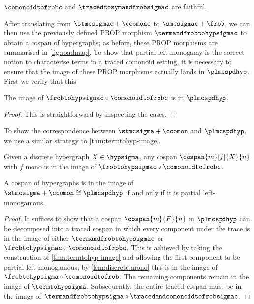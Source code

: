 \begin{corollary}
    \(\comonoidtofrobc\) and \(\tracedtosymandfrobsigmac\) are faithful.
\end{corollary}

After translating from \(\stmcsigmac + \ccomonc\) to \(\smcsigmac + \frob\),
we can then use the previously defined PROP morphism \(\termandfrobtohypsigmac\)
to obtain a cospan of hypergraphs; as before, these PROP morphisms are
summarised in \cref{fig:roadmap}.
To show that partial left-monogamy is the correct notion to characterise terms
in a traced comonoid setting, it is necessary to ensure that the image of these
PROP morphisms actually lands in \(\plmcspdhyp\).
First we verify that this

\begin{lemma}
    The image of \(\frobtohypsigmac \circ \comonoidtofrobc\) is in
    \(\plmcspdhyp\).
\end{lemma}
\begin{proof}
    This is straightforward by inspecting the cases.
\end{proof}

To show the correspondence between \(\stmcsigma + \ccomon\) and
\(\plmcspdhyp\), we use a similar strategy to \cref{thm:termtohyp-image}.

\begin{lemma}\label{lem:discrete-mono}
    Given a discrete hypergraph \(X \in \hypsigma\), any cospan
    \(\cospan{m}[f]{X}{n}\) with \(f\) mono is in the image of
    \(\frobtohypsigmac \circ \comonoidtofrobc\).
\end{lemma}

\begin{theorem}\label{thm:comonoid-fully-complete}
    A cospan of hypergraphs is in the image of
    \(\stmcsigma + \ccomon \cong \plmcspdhyp\) if and only if it is partial
    left-monogamous.
\end{theorem}
\begin{proof}
    It suffices to show that a cospan \(\cospan{m}{F}{n}\) in
    \(\plmcspdhyp\) can be decomposed into a traced cospan in which every
    component under the trace is in the image of either
    \(\termandfrobtohypsigmac\) or \(\frobtohypsigmac \circ \comonoidtofrobc\).
    This is achieved by taking the construction of \cref{thm:termtohyp-image}
    and allowing the first component to be partial left-monogamous; by
    \cref{lem:discrete-mono} this is in the image of
    \(\frobtohypsigma \circ \comonoidtofrob\).
    The remaining components remain in the image of \(\termtohypsigma\).
    Subsequently, the entire traced cospan must be in the image of \(
    \termandfrobtohypsigma \circ \tracedandcomonoidtofrobsigmac
    \).
\end{proof}

